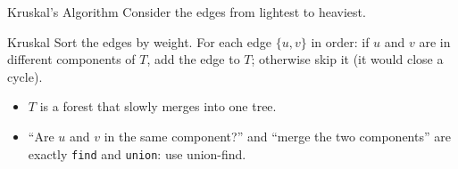 \documentclass[10pt,aspectratio=169]{beamer}
\begin{document}
\begin{frame}{Kruskal's Algorithm}
  Consider the edges from lightest to heaviest.

  \begin{block}{Kruskal}
    Sort the edges by weight. For each edge $\{u, v\}$ in order: if $u$ and
    $v$ are in different components of $T$, add the edge to $T$; otherwise
    skip it (it would close a cycle).
  \end{block}

  \bigskip
  \begin{itemize}
    \item $T$ is a forest that slowly merges into one tree.
    \item ``Are $u$ and $v$ in the same component?'' and ``merge the two
          components'' are exactly \texttt{find} and \texttt{union}:
          use \alert{union-find}.
  \end{itemize}
\end{frame}
\end{document}
